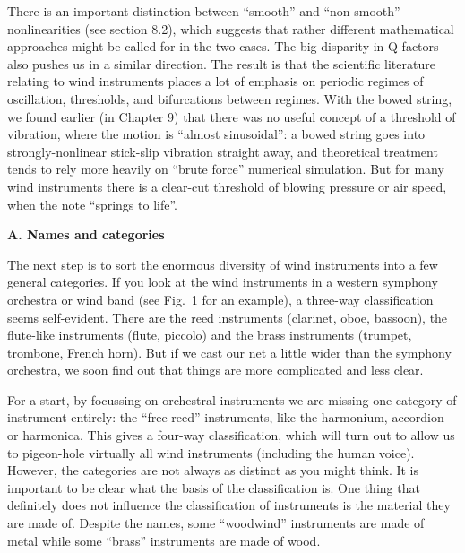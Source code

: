   There is an important distinction between “smooth” and “non-smooth” 
  nonlinearities (see section 8.2), which suggests that rather different 
  mathematical approaches might be called for in the two cases. The big 
  disparity in Q factors also pushes us in a similar direction. The result is 
  that the scientific literature relating to wind instruments places a lot of 
  emphasis on periodic regimes of oscillation, thresholds, and bifurcations 
  between regimes. With the bowed string, we found earlier (in Chapter 9) that 
  there was no useful concept of a threshold of vibration, where the motion is 
  “almost sinusoidal”: a bowed string goes into strongly-nonlinear stick-slip 
  vibration straight away, and theoretical treatment tends to rely more heavily 
  on ``brute force'' numerical simulation. But for many wind instruments there 
  is a clear-cut threshold of blowing pressure or air speed, when the note 
  ``springs to life''. 

  \textbf{A. Names and categories} 

  The next step is to sort the enormous diversity of wind instruments into a 
  few general categories. If you look at the wind instruments in a western 
  symphony orchestra or wind band (see Fig.\ 1 for an example), a three-way 
  classification seems self-evident. There are the reed instruments (clarinet, 
  oboe, bassoon), the flute-like instruments (flute, piccolo) and the brass 
  instruments (trumpet, trombone, French horn). But if we cast our net a little 
  wider than the symphony orchestra, we soon find out that things are more 
  complicated and less clear. 


  For a start, by focussing on orchestral instruments we are missing one 
  category of instrument entirely: the “free reed” instruments, like the 
  harmonium, accordion or harmonica. This gives a four-way classification, 
  which will turn out to allow us to pigeon-hole virtually all wind instruments 
  (including the human voice). However, the categories are not always as 
  distinct as you might think. It is important to be clear what the basis of 
  the classification is. One thing that definitely does not influence the 
  classification of instruments is the material they are made of. Despite the 
  names, some “woodwind” instruments are made of metal while some “brass” 
  instruments are made of wood. 

